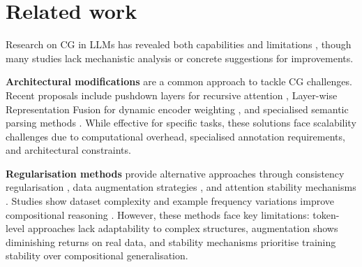 \section{Related work}\label{sec:related}
Research on CG in LLMs has revealed both capabilities and limitations \cite{tull2024towards, moisio-etal-2023-evaluating, sinha2024survey}, though many studies lack mechanistic analysis or concrete suggestions for improvements.

\noindent\textbf{Architectural modifications} are a common approach to tackle CG challenges. Recent proposals include pushdown layers for recursive attention \cite{murty-etal-2023-pushdown}, Layer-wise Representation Fusion for dynamic encoder weighting \cite{lin-etal-2023-learning}, and specialised semantic parsing methods \cite{shaw-etal-2021-compositional}. While effective for specific tasks, these solutions face scalability challenges due to computational overhead, specialised annotation requirements, and architectural constraints.


\noindent\textbf{Regularisation methods} provide alternative approaches through consistency regularisation \cite{yin-etal-2023-consistency}, data augmentation strategies \cite{ontanon-etal-2022-making}, and attention stability mechanisms \cite{zhai2023stabilizing}. Studies show dataset complexity and example frequency variations improve compositional reasoning \cite{zhou-etal-2023-data}. However, these methods face key limitations: token-level approaches lack adaptability to complex structures, augmentation shows diminishing returns on real data, and stability mechanisms prioritise training stability over compositional generalisation.


